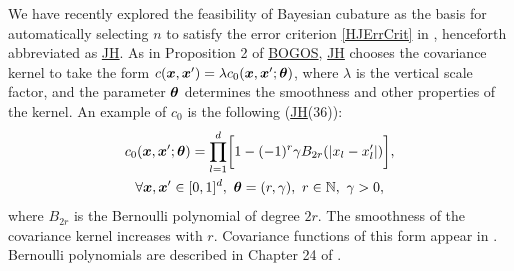 \documentclass[sts]{imsart}
\numberwithin{equation}{section}
\theoremstyle{plain}
\newcommand{\BOGOS}{\hyperlink{BriEtal18a}{BOGOS}\xspace}
\newcommand{\JH}{\hyperlink{RatHic18a}{JH}\xspace}
\begin{document}
We have recently explored the feasibility of Bayesian cubature as the basis for automatically selecting $n$ to satisfy the error criterion \eqref{HJErrCrit}  in \cite{RatHic19a}, henceforth abbreviated as \JH.  As in Proposition 2 of \BOGOS,  \JH chooses the covariance kernel to take the form $c(\boldsymbol{x}, \boldsymbol{x}') =  \lambda c_0(\boldsymbol{x}, \boldsymbol{x}'; \boldsymbol{\theta})$, where $\lambda$ is the vertical scale factor, and the parameter $\boldsymbol{\theta}$ determines the smoothness and other properties of the kernel.  An example of $c_0$ is  the following (\JH (36)):
\begin{multline}
\label{the_kernel_eqn_bernoulli}
c_0(\vx, \vx';\vtheta) =
\prod_{l=1}^d \biggl[
1 - (-1)^{r} \gamma B_{2r}( |{x_l-x'_l}| ) \biggr], \\  
\forall \vx,\vx' \in [0,1]^d, \  \vtheta = (r,\gamma), \ r \in \naturals, \ \gamma > 0,
\end{multline}
where $B_{2r}$ is the Bernoulli polynomial of degree $2r$.  The smoothness of the covariance kernel increases with $r$.  Covariance functions of this form appear in  \cite{Hic96a,DicEtal14a}. Bernoulli polynomials are described in Chapter 24 of \cite{OlvEtal10a}.
\end{document}
